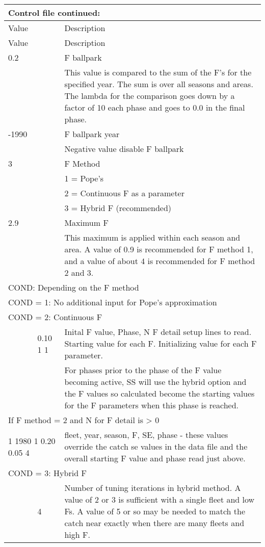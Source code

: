 \begin{center}
		\begin{longtable}{p{1cm} p{3cm} p{11.3cm}}
			\multicolumn{3}{l}{Control file continued:}\\
			\hline
			Value &   &  Description\\
			\hline
			\endfirsthead

			\hline
			Value &  &  Description\\
			\hline
			\endhead

			\endfoot
			\endlastfoot

			0.2 & & F ballpark\\
			    & & This value is compared to the sum of the F’s for the specified year.  The sum is over all seasons and areas.  The lambda for the comparison goes down by a factor of 10 each phase and goes to 0.0 in the final phase.\\
		   \hline
			-1990 & & F ballpark year \\
			      & & Negative value disable F ballpark \\
		   \hline
			 3  & & F Method \\
			    & & 1 = Pope's \\
			    & & 2 = Continuous F as a parameter \\
			    & & 3 = Hybrid F (recommended)\\
		   \hline
		   2.9 & & Maximum F \\
		       & & This maximum is applied within each season and area.   A value of 0.9 is recommended for F method 1, and a value of about 4 is recommended for F method 2 and 3. \\
		   \hline
		   \multicolumn{3}{l}{COND: Depending on the F method} \\
		   \hline
		   \multicolumn{3}{l}{COND = 1: No additional input for Pope's approximation}\\
		   \hline
		   \multicolumn{3}{l}{COND = 2: Continuous F}\\
		   & 0.10  1  1 & Inital F value, Phase, N F detail setup lines to read. Starting value for each F.  Initializing value for each F parameter.\\
		   &  & For phases prior to the phase of the F value becoming active,  SS will use the hybrid option and the F values so calculated become the starting values for the F parameters when this phase is reached.\\
		   \multicolumn{3}{l}{If F method = 2 and N for F detail is > 0}\\
		   \multicolumn{2}{l}{1 1980 1 0.20 0.05 4} & fleet, year, season, F, SE, phase - these values override the catch se values in the data file and the overall starting F value and phase read just above.\\
		   \hline
		   \multicolumn{3}{l}{COND = 3: Hybrid F}\\
		   & 4 & Number of tuning iterations in hybrid method. A value of 2 or 3 is sufficient with a single fleet and low Fs.  A value of 5 or so may be needed to match the catch near exactly when there are many fleets and high F. \\
		   \hline
	\end{longtable}
\end{center}

